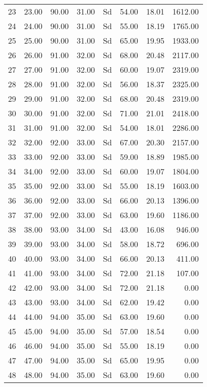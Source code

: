 \documentclass{article}
\begin{document}
\begin{table}[ht]
\begin{tabular}{rrrrlrrr}
  23 & 23.00 & 90.00 & 31.00 & Sd & 54.00 & 18.01 & 1612.00 \\ 
  24 & 24.00 & 90.00 & 31.00 & Sd & 55.00 & 18.19 & 1765.00 \\ 
  25 & 25.00 & 90.00 & 31.00 & Sd & 65.00 & 19.95 & 1933.00 \\ 
  26 & 26.00 & 91.00 & 32.00 & Sd & 68.00 & 20.48 & 2117.00 \\ 
  27 & 27.00 & 91.00 & 32.00 & Sd & 60.00 & 19.07 & 2319.00 \\ 
  28 & 28.00 & 91.00 & 32.00 & Sd & 56.00 & 18.37 & 2325.00 \\ 
  29 & 29.00 & 91.00 & 32.00 & Sd & 68.00 & 20.48 & 2319.00 \\ 
  30 & 30.00 & 91.00 & 32.00 & Sd & 71.00 & 21.01 & 2418.00 \\ 
  31 & 31.00 & 91.00 & 32.00 & Sd & 54.00 & 18.01 & 2286.00 \\ 
  32 & 32.00 & 92.00 & 33.00 & Sd & 67.00 & 20.30 & 2157.00 \\ 
  33 & 33.00 & 92.00 & 33.00 & Sd & 59.00 & 18.89 & 1985.00 \\ 
  34 & 34.00 & 92.00 & 33.00 & Sd & 60.00 & 19.07 & 1804.00 \\ 
  35 & 35.00 & 92.00 & 33.00 & Sd & 55.00 & 18.19 & 1603.00 \\ 
  36 & 36.00 & 92.00 & 33.00 & Sd & 66.00 & 20.13 & 1396.00 \\ 
  37 & 37.00 & 92.00 & 33.00 & Sd & 63.00 & 19.60 & 1186.00 \\ 
  38 & 38.00 & 93.00 & 34.00 & Sd & 43.00 & 16.08 & 946.00 \\ 
  39 & 39.00 & 93.00 & 34.00 & Sd & 58.00 & 18.72 & 696.00 \\ 
  40 & 40.00 & 93.00 & 34.00 & Sd & 66.00 & 20.13 & 411.00 \\ 
  41 & 41.00 & 93.00 & 34.00 & Sd & 72.00 & 21.18 & 107.00 \\ 
  42 & 42.00 & 93.00 & 34.00 & Sd & 72.00 & 21.18 & 0.00 \\ 
  43 & 43.00 & 93.00 & 34.00 & Sd & 62.00 & 19.42 & 0.00 \\ 
  44 & 44.00 & 94.00 & 35.00 & Sd & 63.00 & 19.60 & 0.00 \\ 
  45 & 45.00 & 94.00 & 35.00 & Sd & 57.00 & 18.54 & 0.00 \\ 
  46 & 46.00 & 94.00 & 35.00 & Sd & 55.00 & 18.19 & 0.00 \\ 
  47 & 47.00 & 94.00 & 35.00 & Sd & 65.00 & 19.95 & 0.00 \\ 
  48 & 48.00 & 94.00 & 35.00 & Sd & 63.00 & 19.60 & 0.00 \\ 

\end{tabular}
\end{table}
\end{document}
